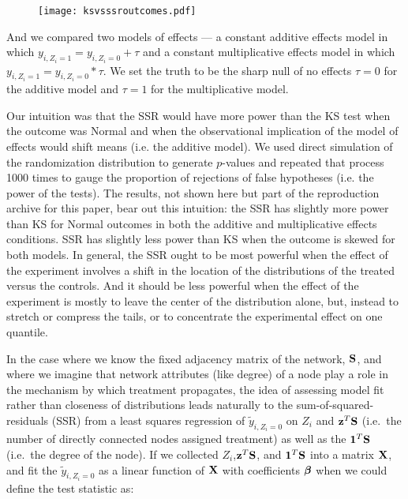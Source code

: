 \begin{figure}[H]\centering
  \texttt{[image: ksvsssroutcomes.pdf]}
  \caption{}\label{fig:simpleoutcomes}
\end{figure}



And we compared two models of effects --- a constant additive
effects model in which $y_{i,Z_i=1}=y_{i,Z_i=0}+\tau$ and a constant
multiplicative effects model in which $y_{i,Z_i=1}=y_{i,Z_i=0}*\tau$. We set
the truth to be the sharp null of no effects $\tau=0$ for the additive model
and $\tau=1$ for the multiplicative model. 






Our intuition was that the SSR
would have more power than the KS test when the outcome was Normal and when
the observational implication of the model of effects would shift means (i.e.
the additive model). We used direct simulation of the randomization
distribution to generate $p$-values and repeated that process 1000 times to
gauge the proportion of rejections of false hypotheses (i.e. the power of the
tests). The results, not shown here but part of the reproduction archive for
this paper, bear out this intuition: the SSR has slightly more power than KS
for Normal outcomes in both the additive and multiplicative effects
conditions. SSR has slightly less power than KS when the outcome is skewed for
both models. In general, the SSR ought to be most powerful when the effect of
the experiment involves a shift in the location of the distributions of the
treated versus the controls. And it should be less powerful when the effect of
the experiment is mostly to leave the center of the distribution alone, but,
instead to stretch or compress the tails, or to concentrate the experimental
effect on one quantile.

In the case where we know
the fixed adjacency matrix of the network, $\mathbf{S}$, and where we imagine that
network attributes (like degree) of a node play a role in the mechanism by
which treatment propagates, the idea of assessing model fit rather than
closeness of distributions leads naturally to the sum-of-squared-residuals
(SSR) from a least squares regression of $ \widetilde y_{i,Z_i=0}$ on $Z_{i}$ and
$\mathbf{z}^{T} \mathbf{S}$ (i.e.\ the number of directly connected nodes assigned treatment)
as well as the $\mathbf{1}^{T} \mathbf{S}$ (i.e.\ the degree of the node). If we
collected $Z_{i}$,$\mathbf{z}^{T} \mathbf{S}$, and $\mathbf{1}^{T} \mathbf{S}$ into a matrix $\mathbf{X}$,
and fit the $\widetilde y_{i,Z_i=0}$ as a linear function of $\mathbf{X}$ with
coefficients $\boldsymbol{\beta}$ when we could define the test statistic as:

